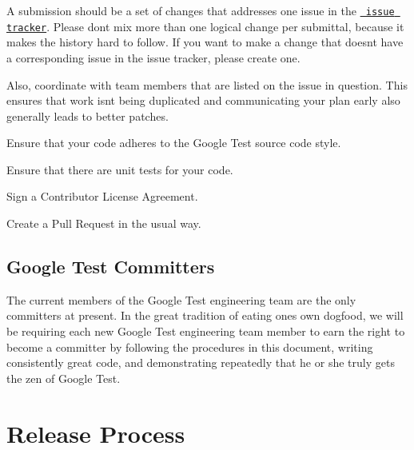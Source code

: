 \begin{DoxyEnumerate}
\item A submission should be a set of changes that addresses one issue in the \href{https://github.com/google/googletest/issues}\texttt{ issue tracker}. Please don\textquotesingle{}t mix more than one logical change per submittal, because it makes the history hard to follow. If you want to make a change that doesn\textquotesingle{}t have a corresponding issue in the issue tracker, please create one.
\end{DoxyEnumerate}
\begin{DoxyEnumerate}
\item Also, coordinate with team members that are listed on the issue in question. This ensures that work isn\textquotesingle{}t being duplicated and communicating your plan early also generally leads to better patches.
\end{DoxyEnumerate}
\begin{DoxyEnumerate}
\item Ensure that your code adheres to the Google Test source code style.
\end{DoxyEnumerate}
\begin{DoxyEnumerate}
\item Ensure that there are unit tests for your code.
\end{DoxyEnumerate}
\begin{DoxyEnumerate}
\item Sign a Contributor License Agreement.
\end{DoxyEnumerate}
\begin{DoxyEnumerate}
\item Create a Pull Request in the usual way.
\end{DoxyEnumerate}

\subsection*{Google Test Committers}

The current members of the Google Test engineering team are the only committers at present. In the great tradition of eating one\textquotesingle{}s own dogfood, we will be requiring each new Google Test engineering team member to earn the right to become a committer by following the procedures in this document, writing consistently great code, and demonstrating repeatedly that he or she truly gets the zen of Google Test.

\section*{Release Process}

